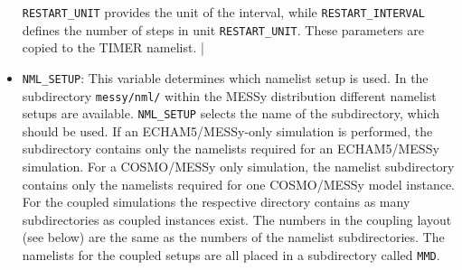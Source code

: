 \documentclass[11pt,twoside]{article}
\begin{document}
\begin{itemize}
\verb|RESTART_UNIT| provides the unit of the
interval, while \verb|RESTART_INTERVAL| defines the number of steps in
unit \verb|RESTART_UNIT|. These parameters are copied to the TIMER namelist. 
|
\item \verb|NML_SETUP|: This variable determines which namelist setup is used.
In the subdirectory \verb|messy/nml/| within the MESSy distribution different
namelist setups are available. 
\verb|NML_SETUP| selects the name of the subdirectory,
which should be used. If an ECHAM5/MESSy-only simulation is 
performed, the subdirectory contains only the namelists required for an 
ECHAM5/MESSy simulation. For a COSMO/MESSy only simulation, the
namelist subdirectory contains only the namelists required for one
COSMO/MESSy model instance.
For the coupled simulations the respective directory contains as 
many subdirectories as coupled instances exist. 
The numbers in the coupling layout 
(see below) are the same as the numbers of the namelist
subdirectories. The namelists for the coupled setups are all placed in
a subdirectory called \verb|MMD|.


\end{itemize}
\end{document}
